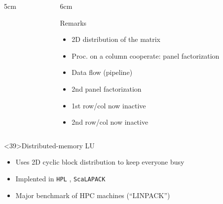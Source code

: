 \documentclass[xcolor={rgb,x11names,svgnames},rgb,x11names,svgnames]{beamer}
\newcommand{\red}{\alert}
\begin{document}
\begin{frame}[label=sca-lu]
\begin{columns}
\begin{column}{5cm}
\end{column}

\begin{column}{6cm}
  \begin{block}{Remarks}
    \begin{itemize}
    \item 2D distribution of the matrix
    \item<2-> Proc. on a column cooperate: \red{panel factorization}
    \item<4-> Data flow (\red{pipeline})
    \item<14-> 2nd panel factorization
    \item<19-> 1st row/col now inactive
    \item<27-> 2nd row/col now inactive
    \end{itemize}
  \end{block}
\end{column}
\end{columns}

\begin{exampleblock}<39>{Distributed-memory LU}
  \begin{itemize}
  \item Uses 2D \red{cyclic} block distribution to keep everyone busy
  \item Implented in \texttt{HPL} , \texttt{ScaLAPACK}
  \item Major benchmark of HPC machines (``LINPACK'')
  \end{itemize}
\end{exampleblock}
\end{frame}

\end{document}
